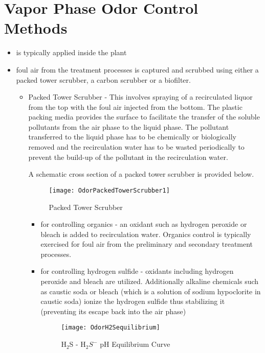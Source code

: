 \section{Vapor Phase Odor Control Methods}
\begin{itemize}
	\item is typically applied inside the plant
	\item foul air from the treatment processes is captured and scrubbed using either a packed tower scrubber, a carbon scrubber or a biofilter.
	\begin{itemize}
		\item Packed Tower Scrubber - This involves spraying of a recirculated liquor from the top with the foul air injected from the bottom.  The plastic packing media provides the surface to facilitate the transfer of the soluble pollutants from the air phase to the liquid phase.  The pollutant transferred to the liquid phase has to be chemically or biologically removed and the recirculation water has to be wasted periodically to prevent the build-up of the pollutant in the recirculation water.

A schematic cross section of a packed tower scrubber is provided below.

\begin{figure}
	\begin{center}
		\texttt{[image: OdorPackedTowerScrubber1]}
			\caption{Packed Tower Scrubber}
	\end{center}
	
	\end{figure}
		\begin{itemize}
			\item for controlling organics - an oxidant such as hydrogen peroxide or bleach is added to recirculation water.  Organics control is typically exercised for foul air from the preliminary and secondary treatment processes.
			\item for controlling hydrogen sulfide - oxidants including hydrogen peroxide and bleach are utilized.  Additionally alkaline chemicals such as caustic soda or bleach (which is a solution of sodium hypoclorite in caustic soda) ionize the hydrogen sulfide thus stabilizing it (preventing its escape back into the air phase)


\begin{figure}
	\begin{center}
		\texttt{[image: OdorH2Sequilibrium]}
			\caption{H$_2$S - H$_2S^-$ pH Equilibrium Curve}
	\end{center}
	

\end{figure}
\end{itemize}
\end{itemize}
\end{itemize}
